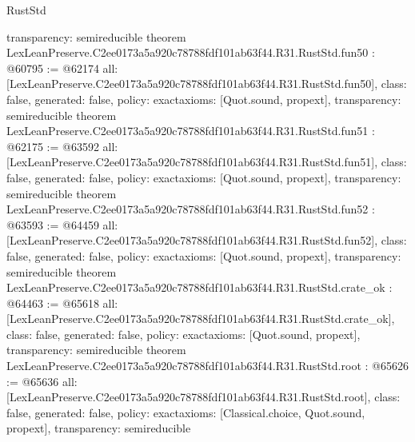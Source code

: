 \begin{lexlean}{RustStd}
\begin{coremodule}
{  transparency: semireducible
}
theorem LexLeanPreserve.C2ee0173a5a920c78788fdf101ab63f44.R31.RustStd.fun50 : @60795 := @62174 {
  all: [LexLeanPreserve.C2ee0173a5a920c78788fdf101ab63f44.R31.RustStd.fun50],
  class: false,
  generated: false,
  policy: exact{axioms: [Quot.sound, propext]},
  transparency: semireducible
}
theorem LexLeanPreserve.C2ee0173a5a920c78788fdf101ab63f44.R31.RustStd.fun51 : @62175 := @63592 {
  all: [LexLeanPreserve.C2ee0173a5a920c78788fdf101ab63f44.R31.RustStd.fun51],
  class: false,
  generated: false,
  policy: exact{axioms: [Quot.sound, propext]},
  transparency: semireducible
}
theorem LexLeanPreserve.C2ee0173a5a920c78788fdf101ab63f44.R31.RustStd.fun52 : @63593 := @64459 {
  all: [LexLeanPreserve.C2ee0173a5a920c78788fdf101ab63f44.R31.RustStd.fun52],
  class: false,
  generated: false,
  policy: exact{axioms: [Quot.sound, propext]},
  transparency: semireducible
}
theorem LexLeanPreserve.C2ee0173a5a920c78788fdf101ab63f44.R31.RustStd.crate_ok : @64463 := @65618 {
  all: [LexLeanPreserve.C2ee0173a5a920c78788fdf101ab63f44.R31.RustStd.crate_ok],
  class: false,
  generated: false,
  policy: exact{axioms: [Quot.sound, propext]},
  transparency: semireducible
}
theorem LexLeanPreserve.C2ee0173a5a920c78788fdf101ab63f44.R31.RustStd.root : @65626 := @65636 {
  all: [LexLeanPreserve.C2ee0173a5a920c78788fdf101ab63f44.R31.RustStd.root],
  class: false,
  generated: false,
  policy: exact{axioms: [Classical.choice, Quot.sound, propext]},
  transparency: semireducible
}


\end{coremodule}
\end{lexlean}
